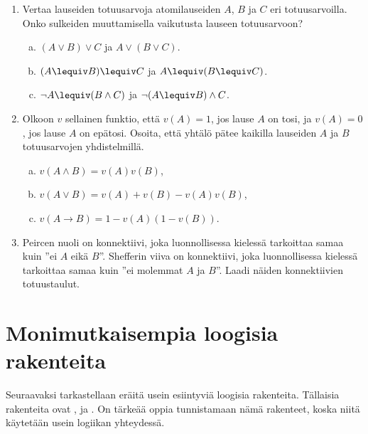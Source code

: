\begin{enumerate}
\item
Vertaa lauseiden totuusarvoja atomilauseiden $A$, $B$ ja $C$ eri totuusarvoilla. Onko sulkeiden muuttamisella vaikutusta lauseen totuusarvoon?

\begin{enumerate}[a)]

\item $(A\lor B)\lor C$ ja $A\lor (B\lor C)$.

\item $(A\lequiv B)\lequiv C$ ja $A\lequiv (B\lequiv C)$.

\item $\lnot A \lequiv (B \land C)$ ja $\lnot (A \lequiv B) \land C$.

\end{enumerate}


\item
Olkoon $v$ sellainen funktio, että $v(A) = 1$, jos lause $A$ on tosi, ja $v(A) = 0$, jos lause $A$ on epätosi. Osoita, että yhtälö pätee kaikilla lauseiden $A$ ja $B$ totuusarvojen yhdistelmillä.

\begin{enumerate}[a)]
\item $v(A\land B)=v(A)v(B)$,
\item $v(A\lor B)=v(A)+v(B)- v(A)v(B)$,
\item $v(A\to B)=1-v(A)(1-v(B))$.
\end{enumerate}

\item
Peircen nuoli on konnektiivi, joka luonnollisessa kielessä tarkoittaa samaa kuin ''ei $A$ eikä $B$''. Shefferin viiva on konnektiivi, joka luonnollisessa kielessä tarkoittaa samaa kuin ''ei molemmat $A$ ja $B$''. Laadi näiden konnektiivien totuustaulut. 
\end{enumerate}

\newpage

\section{Monimutkaisempia loogisia rakenteita}
\label{monimloog}
Seuraavaksi tarkastellaan eräitä usein esiintyviä loogisia rakenteita. Tällaisia rakenteita ovat ,  ja . On tärkeää oppia tunnistamaan nämä rakenteet, koska niitä käytetään usein logiikan yhteydessä.

